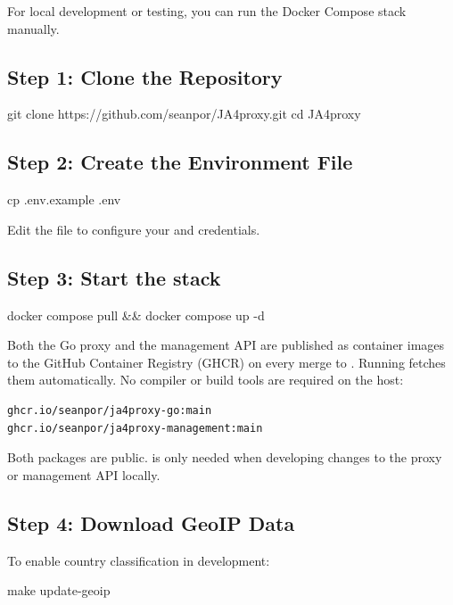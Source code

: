 For local development or testing, you can run the Docker Compose stack manually.

\subsection{Step 1: Clone the Repository}
\begin{bashcode}
git clone https://github.com/seanpor/JA4proxy.git
cd JA4proxy
\end{bashcode}

\subsection{Step 2: Create the Environment File}
\begin{bashcode}
cp .env.example .env
\end{bashcode}
Edit the file to configure your  and credentials.

\subsection{Step 3: Start the stack}

\begin{bashcode}
docker compose pull && docker compose up -d
\end{bashcode}

\begin{tipbox}
Both the Go proxy and the management API are published as container images to the
GitHub Container Registry (GHCR) on every merge to . Running
 fetches them automatically. No compiler or build tools
are required on the host:
\begin{lstlisting}[language=bash, numbers=none]
ghcr.io/seanpor/ja4proxy-go:main
ghcr.io/seanpor/ja4proxy-management:main
\end{lstlisting}
Both packages are public.  is only needed when
developing changes to the proxy or management API locally.
\end{tipbox}

\subsection{Step 4: Download GeoIP Data}
To enable country classification in development:
\begin{bashcode}
make update-geoip
\end{bashcode}

